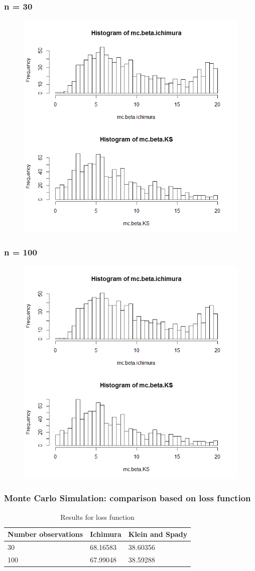 \documentclass{beamer}
\begin{document}

\begin{frame}
\frametitle{n = 30}
\begin{figure}
\includegraphics[width=0.6\linewidth]{30.png}
\end{figure}
\end{frame}



\begin{frame}
\frametitle{n = 100}
\begin{figure}
\includegraphics[width=0.6\linewidth]{100.png}
\end{figure}
\end{frame}



 \begin{frame}[t]
	\frametitle{Monte Carlo Simulation: comparison based on loss function}

\begin{table}
\begin{tabular}{l l l}
\toprule
\textbf{Number observations} & \textbf{Ichimura} & \textbf{Klein and Spady}\\
\midrule
30 & 68.16583 & 38.60356 \\
100 & 67.99048 & 38.59288 \\
\bottomrule
\end{tabular}
\caption{Results for loss function}
\end{table}
	\note{~}
\end{frame}
\end{document}
